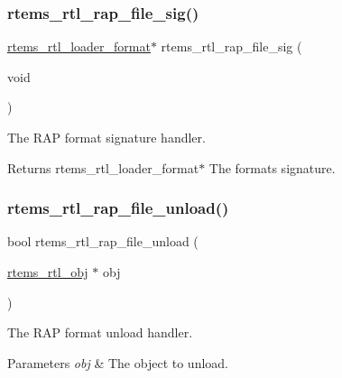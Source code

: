 \subsubsection{\texorpdfstring{rtems\_rtl\_rap\_file\_sig()}{rtems\_rtl\_rap\_file\_sig()}}
{\footnotesize\ttfamily \mbox{\hyperlink{structrtems__rtl__loader__format}{rtems\+\_\+rtl\+\_\+loader\+\_\+format}}$\ast$ rtems\+\_\+rtl\+\_\+rap\+\_\+file\+\_\+sig (\begin{DoxyParamCaption}\item[{void}]{ }\end{DoxyParamCaption})}

The R\+AP format signature handler.

\begin{DoxyReturn}{Returns}
rtems\+\_\+rtl\+\_\+loader\+\_\+format$\ast$ The format\textquotesingle{}s signature. 
\end{DoxyReturn}
\mbox{\label{rtl-rap_8h_ab14c07dd22f90a014ff7e192015cf1c4}} 
\subsubsection{\texorpdfstring{rtems\_rtl\_rap\_file\_unload()}{rtems\_rtl\_rap\_file\_unload()}}
{\footnotesize\ttfamily bool rtems\+\_\+rtl\+\_\+rap\+\_\+file\+\_\+unload (\begin{DoxyParamCaption}\item[{\mbox{\hyperlink{structrtems__rtl__obj}{rtems\+\_\+rtl\+\_\+obj}} $\ast$}]{obj }\end{DoxyParamCaption})}

The R\+AP format unload handler.


\begin{DoxyParams}{Parameters}
{\em obj} & The object to unload. \\
\hline
\end{DoxyParams}

